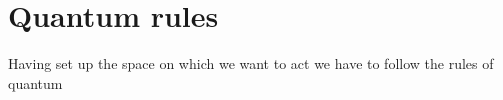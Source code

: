 \section{Quantum rules}
Having set up the space on which we want to act we have to follow the rules of quantum